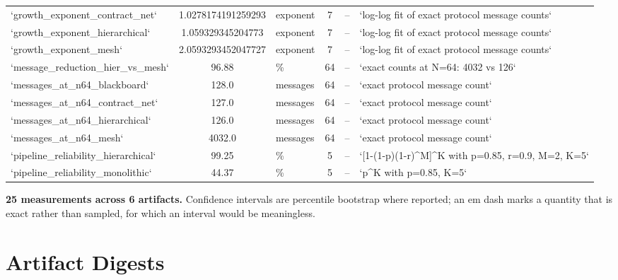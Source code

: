 \documentclass{article}
\begin{document}
\begin{table}[htbp]
{\begin{tabular}{lclcll}
`growth\_exponent\_contract\_net` & 1.0278174191259293 & exponent & 7 & -- & `log-log fit of exact protocol message counts` \\
`growth\_exponent\_hierarchical` & 1.059329345204773 & exponent & 7 & -- & `log-log fit of exact protocol message counts` \\
`growth\_exponent\_mesh` & 2.0593293452047727 & exponent & 7 & -- & `log-log fit of exact protocol message counts` \\
`message\_reduction\_hier\_vs\_mesh` & 96.88 & \% & 64 & -- & `exact counts at N=64: 4032 vs 126` \\
`messages\_at\_n64\_blackboard` & 128.0 & messages & 64 & -- & `exact protocol message count` \\
`messages\_at\_n64\_contract\_net` & 127.0 & messages & 64 & -- & `exact protocol message count` \\
`messages\_at\_n64\_hierarchical` & 126.0 & messages & 64 & -- & `exact protocol message count` \\
`messages\_at\_n64\_mesh` & 4032.0 & messages & 64 & -- & `exact protocol message count` \\
`pipeline\_reliability\_hierarchical` & 99.25 & \% & 5 & -- & `[1-(1-p)(1-r)^M]^K with p=0.85, r=0.9, M=2, K=5` \\
`pipeline\_reliability\_monolithic` & 44.37 & \% & 5 & -- & `p^K with p=0.85, K=5` \\
\bottomrule
\end{tabular}}
\end{table}

\textbf{25 measurements across 6 artifacts.} Confidence intervals are percentile bootstrap where reported; an em dash marks a quantity that is exact rather than sampled, for which an interval would be meaningless.


\section{Artifact Digests}
\begin{table}[htbp]
\centering
{}
\end{table}
\end{document}
